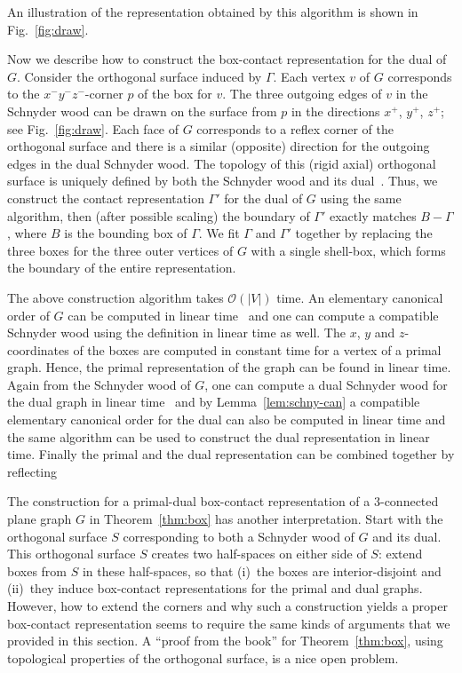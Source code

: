 \documentclass{article}
\newcommand{\Oh}{{\ensuremath{\mathcal{O}}}}
\begin{document}
An illustration of the representation obtained by this algorithm is shown in Fig.~\ref{fig:draw}.


Now we describe how to construct the box-contact representation for the dual of $G$.
Consider the orthogonal surface induced by $\Gamma$. Each vertex $v$ of $G$ corresponds
 to the $x^-y^-z^-$-corner $p$ of the box for $v$. The three outgoing edges of $v$ in the Schnyder
 wood can be drawn on the surface from $p$ in the directions $x^+$, $y^+$, $z^+$; see Fig.~\ref{fig:draw}.
Each face of $G$ corresponds to a reflex corner of the orthogonal surface and there is a similar
 (opposite) direction for the outgoing edges in the dual Schnyder wood. The topology of this
 (rigid axial) orthogonal surface is uniquely defined by both the Schnyder wood and its dual~\cite{FZ08}.
Thus, we construct the contact representation $\Gamma'$ for the dual of $G$ using the same algorithm,
 then (after possible scaling) the boundary of $\Gamma'$ exactly matches $B-\Gamma$, where $B$
 is the bounding box of $\Gamma$.
We fit $\Gamma$ and $\Gamma'$ together by replacing the three boxes for the three outer vertices of $G$ with a single shell-box, which forms the boundary of the entire representation.



The above construction algorithm takes $\Oh(|V|)$ time. An elementary canonical order of $G$ can be
 computed in linear time~\cite{Kan96} and one can compute a compatible Schnyder wood using the
 definition in linear time as well.
The $x$, $y$ and $z$-coordinates of the boxes are computed in constant time for a vertex of a primal
 graph. Hence, the primal representation of the graph can be found in linear time.
Again from the Schnyder wood of $G$, one can compute a dual Schnyder wood for the dual graph
 in linear time~\cite{FZ08} and by Lemma~\ref{lem:schny-can} a compatible elementary canonical order
 for the dual can also be computed in linear time and the same algorithm can be used to construct the
 dual representation in linear time.
 Finally the primal and the dual representation can be combined together by reflecting







The construction for a primal-dual box-contact representation
 of a $3$-connected plane graph $G$ in Theorem~\ref{thm:box} has another interpretation. Start with the orthogonal surface $S$ corresponding to both a Schnyder wood of $G$ and its dual. This orthogonal surface $S$ creates two half-spaces on either side of $S$: extend boxes from $S$ in these half-spaces, so that
(i)~the boxes are interior-disjoint and (ii)~they induce box-contact representations for the
 primal and dual graphs. However, how to extend the corners and why such a construction yields a proper box-contact representation seems to require the same kinds of arguments that we provided in this section.
A ``proof from the book'' for Theorem~\ref{thm:box}, using topological properties of the orthogonal surface, is a nice open problem.
\end{document}
